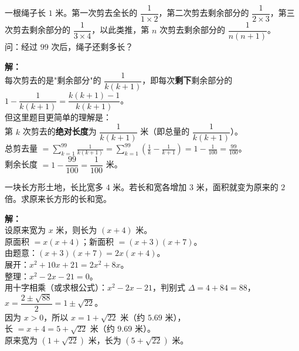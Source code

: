\documentclass[12pt, a4paper]{ctexart}
\begin{document}
\begin{appbox}[【应用 2】裂项求和在实际问题中的应用]
一根绳子长 $1$ 米。第一次剪去全长的 $\dfrac{1}{1\times2}$，第二次剪去剩余部分的 $\dfrac{1}{2\times3}$，第三次剪去剩余部分的 $\dfrac{1}{3\times4}$，以此类推，第 $n$ 次剪去剩余部分的 $\dfrac{1}{n(n+1)}$。\\
问：经过 $99$ 次后，绳子还剩多长？
\end{appbox}

\textbf{解：}\\[3pt]
每次剪去的是"剩余部分"的 $\dfrac{1}{k(k+1)}$，即每次\textbf{剩下}剩余部分的 $1-\dfrac{1}{k(k+1)}=\dfrac{k(k+1)-1}{k(k+1)}$。\\[4pt]
但这里题目更简单的理解是：\\
第 $k$ 次剪去的\textbf{绝对长度}为 $\dfrac{1}{k(k+1)}$ 米（即总量的 $\dfrac{1}{k(k+1)}$）。\\[3pt]
总剪去量 $= \displaystyle\sum_{k=1}^{99}\frac{1}{k(k+1)} = \sum_{k=1}^{99}\left(\frac{1}{k}-\frac{1}{k+1}\right) = 1 - \frac{1}{100} = \frac{99}{100}$。\\[3pt]
剩余长度 $= 1 - \dfrac{99}{100} = \boxed{\dfrac{1}{100}}$ 米。

\begin{appbox}[【应用 3】利用整式运算解决面积问题]
一块长方形土地，长比宽多 $4$ 米。若长和宽各增加 $3$ 米，面积就变为原来的 $2$ 倍。求原来长方形的长和宽。
\end{appbox}

\textbf{解：}\\[3pt]
设原来宽为 $x$ 米，则长为 $(x+4)$ 米。\\[3pt]
原面积 $= x(x+4)$；\quad 新面积 $= (x+3)(x+7)$。\\[3pt]
由题意：$(x+3)(x+7) = 2x(x+4)$。\\[3pt]
展开：$x^2 + 10x + 21 = 2x^2 + 8x$。\\[3pt]
整理：$x^2 - 2x - 21 = 0$。\\[3pt]
用十字相乘（或求根公式）：$x^2-2x-21$，判别式 $\Delta = 4+84 = 88$，\\
$x = \dfrac{2 \pm \sqrt{88}}{2} = 1 \pm \sqrt{22}$。\\[3pt]
因为 $x > 0$，所以 $x = 1 + \sqrt{22}$ 米（约 $5.69$ 米），\\
长 $= x + 4 = 5 + \sqrt{22}$ 米（约 $9.69$ 米）。\\[3pt]
$\boxed{\text{原来宽为 } (1+\sqrt{22}) \text{ 米，长为 } (5+\sqrt{22}) \text{ 米。}}$


\end{document}
